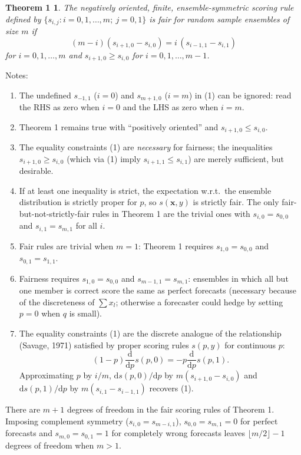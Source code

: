 \documentclass{article}
\newtheorem*{theorem1}{Theorem 1}
\newcommand{\bx}{\mathbf{x}}
\newcommand{\dd}{\mathrm{d}}
\begin{document}
\begin{theorem1}
The negatively oriented, finite, ensemble-symmetric scoring rule defined by
$\{s_{i,j}: i=0,1,\dots,m;\ j=0,1\}$ is fair for random sample ensembles of
size $m$ if
\begin{equation}\tag{1}
  (m-i)(s_{i+1,0}-s_{i,0}) = i\,(s_{i-1,1}-s_{i,1})
\end{equation}
for $i=0,1,\dots,m$ and $s_{i+1,0}\ge s_{i,0}$ for $i=0,1,\dots,m-1$.
\end{theorem1}

Notes:
\begin{enumerate}
\item The undefined $s_{-1,1}$ ($i=0$) and $s_{m+1,0}$ ($i=m$) in (1) can be
ignored: read the RHS as zero when $i=0$ and the LHS as zero when $i=m$.
\item Theorem 1 remains true with ``positively oriented'' and
$s_{i+1,0}\le s_{i,0}$.
\item The equality constraints (1) are \emph{necessary} for fairness; the
inequalities $s_{i+1,0}\ge s_{i,0}$ (which via (1) imply
$s_{i+1,1}\le s_{i,1}$) are merely sufficient, but desirable.
\item If at least one inequality is strict, the expectation w.r.t.\ the
ensemble distribution is strictly proper for $p$, so $s(\bx,y)$ is strictly
fair. The only fair-but-not-strictly-fair rules in Theorem 1 are the trivial
ones with $s_{i,0}=s_{0,0}$ and $s_{i,1}=s_{m,1}$ for all $i$.
\item Fair rules are trivial when $m=1$: Theorem 1 requires $s_{1,0}=s_{0,0}$
and $s_{0,1}=s_{1,1}$.
\item Fairness requires $s_{1,0}=s_{0,0}$ and $s_{m-1,1}=s_{m,1}$: ensembles in
which all but one member is correct score the same as perfect forecasts
(necessary because of the discreteness of $\sum x_l$; otherwise a forecaster
could hedge by setting $p=0$ when $q$ is small).
\item The equality constraints (1) are the discrete analogue of the relationship
(Savage, 1971) satisfied by proper scoring rules $s(p,y)$ for continuous $p$:
\[
  (1-p)\frac{\dd}{\dd p}s(p,0) = -p\frac{\dd}{\dd p}s(p,1).
\]
Approximating $p$ by $i/m$, $\dd s(p,0)/\dd p$ by $m(s_{i+1,0}-s_{i,0})$ and
$\dd s(p,1)/\dd p$ by $m(s_{i,1}-s_{i-1,1})$ recovers (1).
\end{enumerate}

There are $m+1$ degrees of freedom in the fair scoring rules of Theorem 1.
Imposing complement symmetry ($s_{i,0}=s_{m-i,1}$), $s_{0,0}=s_{m,1}=0$ for
perfect forecasts and $s_{m,0}=s_{0,1}=1$ for completely wrong forecasts leaves
$\lfloor m/2\rfloor-1$ degrees of freedom when $m>1$.
\end{document}
